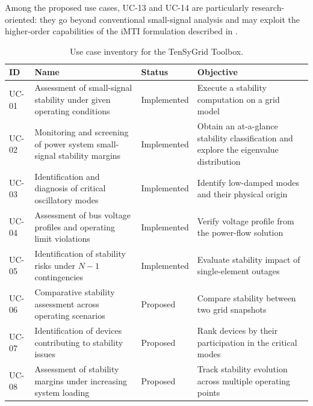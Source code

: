 Among the proposed use cases, UC-13 and UC-14 are particularly research-oriented: they go beyond conventional small-signal analysis and may exploit the higher-order capabilities of the iMTI formulation described in \cite{Kaufmann2025TenSyGridD11}.
\begin{table}[H]
  \centering
  \caption{Use case inventory for the TenSyGrid Toolbox.}
  \label{tab:uc-inventory}
  {\small\begin{tabular}{lp{}lp{}}
    \toprule
    \textbf{ID} & \textbf{Name}                                  & \textbf{Status} & \textbf{Objective}                                                                     \\
    \midrule
    UC-01       & Assessment of small-signal stability under given operating conditions & Implemented     & Execute a stability computation on a grid model                                        \\
    UC-02       & Monitoring and screening of power system small-signal stability margins & Implemented     & Obtain an at-a-glance stability classification and explore the eigenvalue distribution \\
    UC-03       & Identification and diagnosis of critical oscillatory modes & Implemented     & Identify low-damped modes and their physical origin                                    \\
    UC-04       & Assessment of bus voltage profiles and operating limit violations & Implemented     & Verify voltage profile from the power-flow solution                                    \\
    UC-05       & Identification of stability risks under $N-1$ contingencies & Implemented     & Evaluate stability impact of single-element outages                                    \\
    \midrule
    UC-06       & Comparative stability assessment across operating scenarios & Proposed        & Compare stability between two grid snapshots                                           \\
    UC-07       & Identification of devices contributing to stability issues & Proposed        & Rank devices by their participation in the critical modes                              \\
    UC-08       & Assessment of stability margins under increasing system loading & Proposed        & Track stability evolution across multiple operating points                             \\

\end{tabular}}
\end{table}
